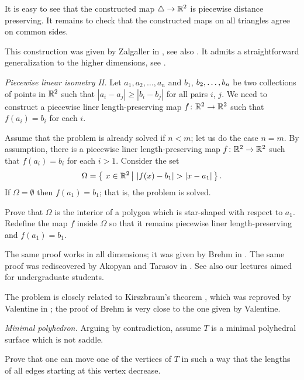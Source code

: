 It is easy to see that the constructed map $\triangle\to\mathbb{R}^2$ is piecewise distance preserving.
It remains to check that the constructed maps on all triangles agree on common sides.


This construction was given by Zalgaller in \cite{zalgaller-polyhedra}, see also \cite{petrunin-yashinsky}.
It admits a straightforward generalization to the higher dimensions, see \cite{krat}.



\textit{Piecewise linear isometry {\rm II}.}
Let $a_1,a_2,\dots,a_n$
and $b_1$, $b_2,\z\dots,b_n$
be two collections of points in $\mathbb{R}^2$
such that $|a_i-a_j|\ge |b_i-b_j|$ for all pairs $i$, $j$.
We need to construct a piecewise liner length-preserving map $f\colon\mathbb{R}^2\to\mathbb{R}^2$
such that $f(a_i)=b_i$ for each $i$.

Assume that the problem is already solved if $n<m$;
let us do the case $n=m$.
By assumption, 
there is a piecewise liner length-preserving map $f\colon\mathbb{R}^2\to\mathbb{R}^2$
such that $f(a_i)=b_i$ for each $i>1$.
Consider the set 
\[\Omega=\set{x\in\RR^2}{|f(x)-b_1|>|x-a_1|}.\]
If $\Omega=\emptyset$ then $f(a_1)=b_1$; 
that is, the problem is solved.

Prove that $\Omega$ is the interior of a polygon
which is star-shaped with respect to $a_1$.
Redefine the map $f$ inside $\Omega$ so that it remains piecewise liner length-preserving and $f(a_1)=b_1$.

The same proof works in all dimensions;
it was given by Brehm in \cite{brehm}.
The same proof was rediscovered by Akopyan and Tarasov in \cite{akopyan-tarasov}.
See also our lectures \cite{petrunin-yashinsky} aimed for undergraduate students.

The problem is closely related to Kirszbraun's theorem \cite{kirszbraun},
which was reproved by Valentine in \cite{valentine};
the proof of Brehm is very close to the one given by Valentine.






\textit{Minimal polyhedron.}
Arguing by contradiction, assume $T$ is a minimal polyhedral surface which is not saddle.

Prove that 
one can move one of the vertices of $T$ in such a way that the lengths of all edges starting at this vertex decrease.

